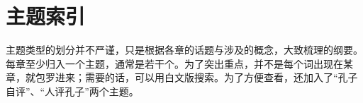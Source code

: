 \chapter*{主\quad 题\quad 索\quad 引}

主题类型的划分并不严谨，只是根据各章的话题与涉及的概念，大致梳理的纲要。每章至少归入一个主题，通常是若干个。为了突出重点，并不是每个词出现在某章，就包罗进来；需要的话，可以用白文版搜索。为了方便查看，还加入了“孔子自评”、“人评孔子”两个主题。

\bigskip

